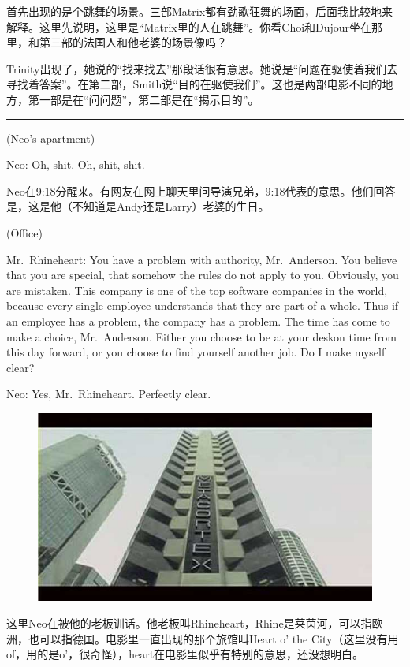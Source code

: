 \documentclass[UTF8]{ctexart}
\newcommand{\myparsep}{\noindent \rule[0.5ex]{\linewidth}{1pt}}
\newenvironment{myquote}{\color{green} \setlength{\leftskip}{6em} \setlength{\rightskip}{4em} \setlength{\parindent}{-2em}}{\par}
\begin{document}
首先出现的是个跳舞的场景。三部Matrix都有劲歌狂舞的场面，后面我比较地来解释。这里先说明，这里是“Matrix里的人在跳舞”。你看Choi和Dujour坐在那里，和第三部的法国人和他老婆的场景像吗？

Trinity出现了，她说的“找来找去”那段话很有意思。她说是“问题在驱使着我们去寻找着答案”。在第二部，Smith说“目的在驱使我们”。这也是两部电影不同的地方，第一部是在“问问题”，第二部是在“揭示目的”。

\myparsep

\begin{myquote}
(Neo's apartment)

Neo: Oh, shit. Oh, shit, shit.
\end{myquote}

Neo在9:18分醒来。有网友在网上聊天里问导演兄弟，9:18代表的意思。他们回答是，这是他（不知道是Andy还是Larry）老婆的生日。

\begin{myquote}
(Office)

Mr.~Rhineheart: You have a problem with authority, Mr.~Anderson. You believe that you are special, that somehow the rules do not apply to you. Obviously, you are mistaken. This company is one of the top software companies in the world, because every single employee understands that they are part of a whole. Thus if an employee has a problem, the company has a problem. The time has come to make a choice, Mr.~Anderson. Either you choose to be at your deskon time from this day forward, or you choose to find yourself another job. Do I make myself clear?

Neo: Yes, Mr.~Rhineheart. Perfectly clear.
\end{myquote}

\begin{figure}[htb]
\centering
\includegraphics[width=0.5\linewidth]{fig/read_Matrix-6}
\end{figure}

这里Neo在被他的老板训话。他老板叫Rhineheart，Rhine是莱茵河，可以指欧洲，也可以指德国。电影里一直出现的那个旅馆叫Heart o' the City（这里没有用of，用的是o'，很奇怪），heart在电影里似乎有特别的意思，还没想明白。
\end{document}
